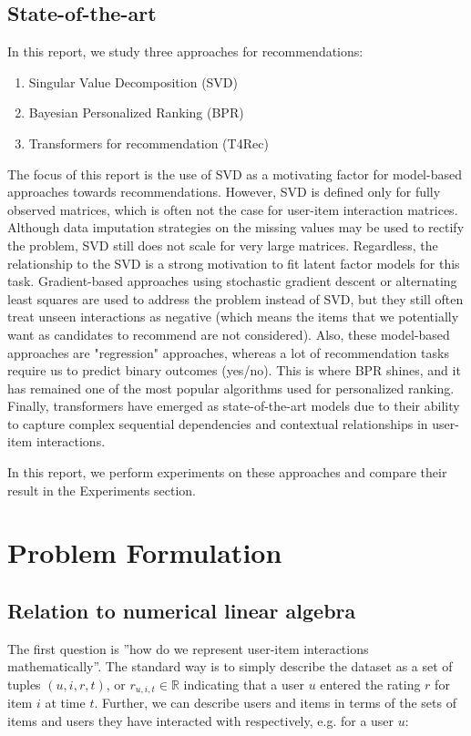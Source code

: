 \documentclass{article}
\begin{document}
\subsection{State-of-the-art}
In this report, we study three approaches for recommendations: 

\begin{enumerate}
    \item Singular Value Decomposition (SVD)
    \item Bayesian Personalized Ranking (BPR)
    \item Transformers for recommendation (T4Rec)
\end{enumerate}

The focus of this report is the use of SVD as a motivating factor for model-based approaches towards recommendations. However, SVD is defined only for fully observed matrices, which is often not the case for user-item interaction matrices. Although data imputation strategies on the missing values may be used to rectify the problem, SVD still does not scale for very large matrices. Regardless, the relationship to the SVD is a strong motivation to fit latent factor models for this task. Gradient-based approaches using stochastic gradient descent or alternating least squares are used to address the problem instead of SVD, but they still often treat unseen interactions as negative (which means the items that we potentially want as candidates to recommend are not considered). Also, these model-based approaches are "regression" approaches, whereas a lot of recommendation tasks require us to predict binary outcomes (yes/no). This is where BPR shines, and it has remained one of the most popular algorithms used for personalized ranking. Finally, transformers have emerged as state-of-the-art models due to their ability to capture complex sequential dependencies and contextual relationships in user-item interactions.

In this report, we perform experiments on these approaches and compare their result in the Experiments section. 


\section{Problem Formulation}

\subsection{Relation to numerical linear algebra}
The first question is ”how do we represent user-item interactions mathematically”. The standard way is to simply describe the dataset as a set of tuples $(u, i, r, t)$, or $r_{u,i,t} \in \mathbb{R}$ indicating that a user $u$ entered the rating $r$ for item $i$ at time $t$. Further, we can describe users and items in terms of the sets of items and users they have interacted with respectively, e.g. for a user $u$:
\end{document}
